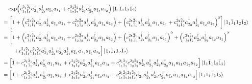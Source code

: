 \documentclass[a4paper]{article}
\numberwithin{equation}{subsection}
\begin{document}
\begin{align}
& \quad \exp(c_{1_1 \bar{1}_1}^{2_1 \bar{2}_1} a^\dagger_{2_1}a^\dagger_{\bar{2}_1} a_{\bar{1}_1}a_{1_1} + c_{1_2 \bar{1}_2}^{2_2 \bar{2}_2} a^\dagger_{2_2}a^\dagger_{\bar{2}_2} a_{\bar{1}_2}a_{1_2}
) \ket{1_1 \bar{1}_1 1_2 \bar{1}_2} \notag\\
&= \qty[ 1 
+ \qty(c_{1_1 \bar{1}_1}^{2_1 \bar{2}_1} a^\dagger_{2_1}a^\dagger_{\bar{2}_1} a_{\bar{1}_1}a_{1_1} + c_{1_2 \bar{1}_2}^{2_2 \bar{2}_2} a^\dagger_{2_2}a^\dagger_{\bar{2}_2} a_{\bar{1}_2}a_{1_2}) 
+ \qty(c_{1_1 \bar{1}_1}^{2_1 \bar{2}_1} a^\dagger_{2_1}a^\dagger_{\bar{2}_1} a_{\bar{1}_1}a_{1_1} + c_{1_2 \bar{1}_2}^{2_2 \bar{2}_2} a^\dagger_{2_2}a^\dagger_{\bar{2}_2} a_{\bar{1}_2}a_{1_2})^2
] \ket{1_1 \bar{1}_1 1_2 \bar{1}_2} \notag\\
&= \left[ 1 
+ \qty(c_{1_1 \bar{1}_1}^{2_1 \bar{2}_1} a^\dagger_{2_1}a^\dagger_{\bar{2}_1} a_{\bar{1}_1}a_{1_1} + c_{1_2 \bar{1}_2}^{2_2 \bar{2}_2} a^\dagger_{2_2}a^\dagger_{\bar{2}_2} a_{\bar{1}_2}a_{1_2}) 
  + \qty(c_{1_1 \bar{1}_1}^{2_1 \bar{2}_1} a^\dagger_{2_1}a^\dagger_{\bar{2}_1} a_{\bar{1}_1}a_{1_1})^2 
  + \qty(c_{1_2 \bar{1}_2}^{2_2 \bar{2}_2} a^\dagger_{2_2}a^\dagger_{\bar{2}_2} a_{\bar{1}_2}a_{1_2})^2 \right. \notag\\
&{} \qquad \left.
  + c_{1_1 \bar{1}_1}^{2_1 \bar{2}_1}c_{1_2 \bar{1}_2}^{2_2 \bar{2}_2} a^\dagger_{2_1}a^\dagger_{\bar{2}_1} a^\dagger_{2_2}a^\dagger_{\bar{2}_2} a_{\bar{1}_1}a_{1_1}  a_{\bar{1}_2}a_{1_2}
\right] \ket{1_1 \bar{1}_1 1_2 \bar{1}_2} \notag\\
&= \qty[1 
+ c_{1_1 \bar{1}_1}^{2_1 \bar{2}_1} a^\dagger_{2_1}a^\dagger_{\bar{2}_1} a_{\bar{1}_1}a_{1_1} 
+ c_{1_2 \bar{1}_2}^{2_2 \bar{2}_2} a^\dagger_{2_2}a^\dagger_{\bar{2}_2} a_{\bar{1}_2}a_{1_2}
+ c_{1_1 \bar{1}_1}^{2_1 \bar{2}_1}c_{1_2 \bar{1}_2}^{2_2 \bar{2}_2} a^\dagger_{2_1}a^\dagger_{\bar{2}_1} a^\dagger_{2_2}a^\dagger_{\bar{2}_2} a_{\bar{1}_1}a_{1_1}  a_{\bar{1}_2}a_{1_2} 
] \ket{1_1 \bar{1}_1 1_2 \bar{1}_2} \notag\\
&= \qty[1 
+ c_{1_1 \bar{1}_1}^{2_1 \bar{2}_1} a^\dagger_{2_1}a^\dagger_{\bar{2}_1} a_{\bar{1}_1}a_{1_1} 
+ c_{1_2 \bar{1}_2}^{2_2 \bar{2}_2} a^\dagger_{2_2}a^\dagger_{\bar{2}_2} a_{\bar{1}_2}a_{1_2}
+ c_{1_1 \bar{1}_1 1_2 \bar{1}_2}^{2_1 \bar{2}_1 2_2 \bar{2}_2}  a^\dagger_{2_1}a^\dagger_{\bar{2}_1} a^\dagger_{2_2}a^\dagger_{\bar{2}_2} a_{\bar{1}_1}a_{1_1}  a_{\bar{1}_2}a_{1_2} 
] \ket{1_1 \bar{1}_1 1_2 \bar{1}_2} 
\end{align}
\end{document}

